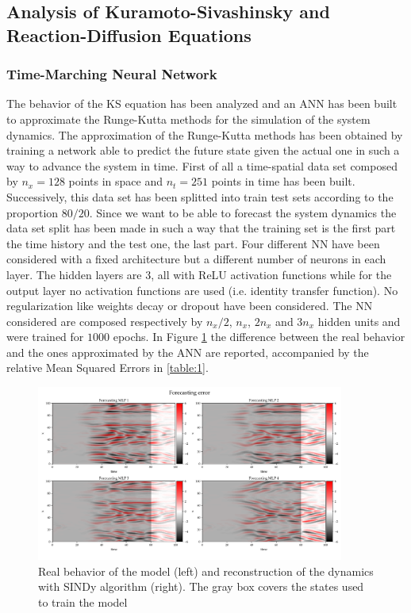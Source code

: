 \documentclass[]{article}
\begin{document}
\subsection{Analysis of Kuramoto-Sivashinsky and Reaction-Diffusion Equations}
\subsubsection{Time-Marching Neural Network}
The behavior of the KS equation has been analyzed and an ANN has been built to approximate the Runge-Kutta methods for the simulation of the system dynamics. The approximation of the Runge-Kutta methods has been obtained by training a network able to predict the future state given the actual one in such a way to advance the system in time. First of all a time-spatial data set composed by $n_x=128$ points in space and $n_t=251$ points in time has been built. Successively, this data set has been splitted into train test sets according to the proportion $ 80/20$. Since we want to be able to forecast the system dynamics the data set split has been made in such a way that the training set is the first part the time history and the test one, the last part. Four different NN have been considered with a fixed architecture but a different number of neurons in each layer. The hidden layers are 3, all with ReLU activation functions while for the output layer no activation functions are used (i.e. identity transfer function). No regularization like weights decay or dropout have been considered. The NN considered are composed respectively by $n_x/2$, $n_x$, $2n_x$ and $3n_x$ hidden units and were trained for $1000$ epochs. In Figure \ref{fig:fig7} the difference between the real behavior and the ones approximated by the ANN are reported, accompanied by the relative Mean Squared Errors in \ref{table:1}.
\begin{figure}[!t]
	\centering
	\includegraphics[width=0.9\textwidth]{../figures/fore_err.pdf}
	\caption{Real behavior of the model (left) and reconstruction of the dynamics with SINDy algorithm (right). The gray box covers the states used to train the model}
	\label{fig:fig7}
\end{figure}
\end{document}
